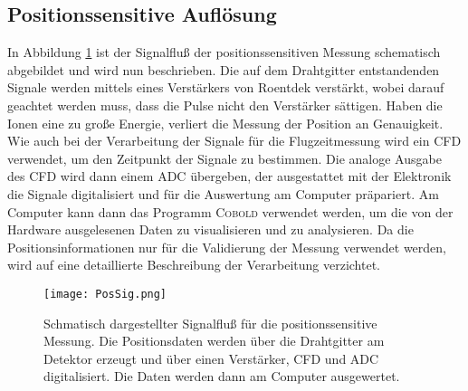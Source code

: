 \subsection{Positionssensitive Auflösung}
In Abbildung \ref{fig:pos} ist der Signalfluß der positionssensitiven Messung schematisch abgebildet und wird nun beschrieben. Die auf dem Drahtgitter entstandenden Signale werden mittels eines Verstärkers von Roentdek verstärkt, wobei darauf geachtet werden muss, dass die Pulse nicht den Verstärker sättigen. Haben die Ionen eine zu große Energie, verliert die Messung der Position an Genauigkeit. Wie auch bei der Verarbeitung der Signale für die Flugzeitmessung wird ein CFD verwendet, um den Zeitpunkt der Signale zu bestimmen. Die analoge Ausgabe des CFD wird dann einem ADC übergeben, der ausgestattet mit der Elektronik die Signale digitalisiert und für die Auswertung am Computer präpariert. Am Computer kann dann das Programm \textsc{Cobold} verwendet werden, um die von der Hardware ausgelesenen Daten zu visualisieren und zu analysieren. Da die Positionsinformationen nur für die Validierung der Messung verwendet werden, wird auf eine detaillierte Beschreibung der Verarbeitung verzichtet.

\begin{figure}
    \centering
    \texttt{[image: PosSig.png]}
    \caption[Signalfluß für die positionssensitive Messung]{Schmatisch dargestellter Signalfluß für die positionssensitive Messung. Die Positionsdaten werden über die Drahtgitter am Detektor erzeugt und über einen Verstärker, CFD und ADC digitalisiert. Die Daten werden dann am Computer ausgewertet.}
    \label{fig:pos} 
\end{figure}